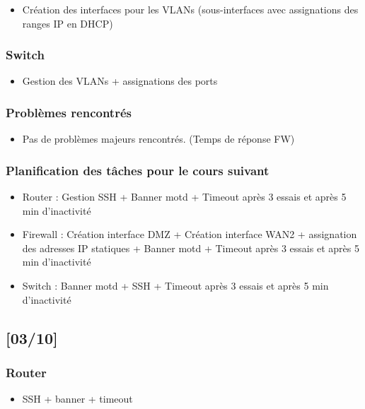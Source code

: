 \documentclass[a4paper,12pt]{article}
\begin{document}
\begin{itemize}
\item Création des interfaces pour les VLANs (sous-interfaces avec assignations des ranges IP en DHCP)
\end{itemize} 
\subsubsection{Switch}

\begin{itemize}
\item Gestion des VLANs + assignations des ports
\end{itemize} 
\subsubsection{Problèmes rencontrés}
\begin{itemize}
\item Pas de problèmes majeurs rencontrés. (Temps de réponse FW)
\end{itemize} 
\subsubsection{Planification des tâches pour le cours suivant}
\begin{itemize}
\item Router : Gestion SSH + Banner motd + Timeout après 3 essais et après 5 min d'inactivité
\item Firewall : Création interface DMZ + Création interface WAN2 + assignation des adresses IP statiques + Banner motd + Timeout après 3 essais et après 5 min d'inactivité
\item Switch : Banner motd + SSH + Timeout après 3 essais et après 5 min d'inactivité
\end{itemize} 

\newpage


\subsection{[03/10]}

\subsubsection{Router}

\begin{itemize}

\item SSH + banner + timeout
\end{itemize} 
\end{document}
